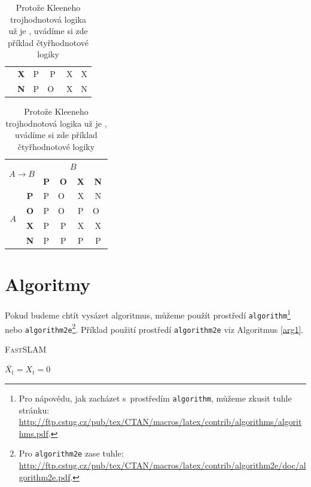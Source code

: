 \documentclass[11pt, a4paper]{article}
\begin{document}
\begin{table}[h]
\begin{tabular}{| c | c | c | c | c | c |}
& \textbf{X} & P & P & X & X \\ \cline{2-6}
& \textbf{N} & P & O~& X & N \\ \hline
\end{tabular}
\begin{tabular}{| c | c | c | c | c | c |} \hline
\multicolumn{2}{|c|}{\multirow{2}{*}{$A \rightarrow B$}} & \multicolumn{4}{c|}{$B$} \\ \cline{3-6}
\multicolumn{2}{|c|}{} & \textbf{P} & \textbf{O} & \textbf{X} & \textbf{N} \\ \hline
\multirow{4}{*}{$A$} & \textbf{P} & P & O~& X & N \\ \cline{2-6}
& \textbf{O} & P & O~& P & O~\\ \cline{2-6}
& \textbf{X} & P & P & X & X \\ \cline{2-6}
& \textbf{N} & P & P & P & P \\ \hline
\end{tabular}
\caption{Protože Kleeneho trojhodnotová logika už je , uvádíme si zde příklad čtyřhodnotové logiky} \label{tab2}
\end{table}
\pagebreak
\section{Algoritmy} \label{sec3}
Pokud budeme chtít vysázet algoritmus, můžeme použít prostředí \texttt{algorithm}\footnote{Pro nápovědu, jak zacházet s~prostředím \texttt{algorithm}, můžeme zkusit tuhle stránku:\\ \href{http://ftp.cstug.cz/pub/tex/CTAN/macros/latex/contrib/algorithms/algorithms.pdf}{http://ftp.cstug.cz/pub/tex/CTAN/macros/latex/contrib/algorithms/algorithms.pdf}.} nebo \texttt{algorithm2e}\footnote{Pro \texttt{algorithm2e} zase tuhle: \href{http://ftp.cstug.cz/pub/tex/CTAN/macros/latex/contrib/algorithm2e/doc/algorithm2e.pdf}{http://ftp.cstug.cz/pub/tex/CTAN/macros/latex/contrib/algorithm2e/doc/algorithm2e.pdf}.}. Příklad použití prostředí \texttt{algorithm2e} viz Algoritmus \ref{arg1}.
\begin{algorithm}[h]
    \caption{\large \textsc{Fast}SLAM} \label{arg1}
    \SetNlSty{}{}{:}
    \SetNlSkip{-0.2cm}
    \SetAlgoNoLine
    \DontPrintSemicolon
    \Indp
    \BlankLine
    $\overline{X_t} = X_t = 0$ \\
\end{algorithm}
\end{document}
